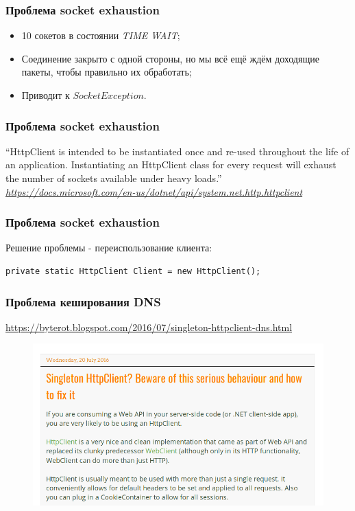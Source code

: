 \documentclass{beamer}
\begin{document}
\begin{frame}
\frametitle{Проблема socket exhaustion}
\begin{itemize}
	\item 10 сокетов в состоянии \textit{TIME WAIT};
	\item Соединение закрыто с одной стороны, но мы всё ещё ждём доходящие пакеты, чтобы правильно их обработать;
	\item Приводит к $SocketException$.
\end{itemize}
\end{frame}

\begin{frame}
\frametitle{Проблема socket exhaustion}
``HttpClient is intended to be instantiated once and re-used throughout the life of an application. Instantiating an HttpClient class for every request will exhaust the number of sockets available under heavy loads.''
\newline
\newline
\textit{\href{https://docs.microsoft.com/en-us/dotnet/api/system.net.http.httpclient}{https://docs.microsoft.com/en-us/dotnet/api/system.net.http.httpclient}}
\end{frame}

\begin{frame}[fragile]
\frametitle{Проблема socket exhaustion}
Решение проблемы - переиспользование клиента:
\begin{lstlisting}
private static HttpClient Client = new HttpClient();
\end{lstlisting}
\end{frame}

\begin{frame}
\frametitle{Проблема кеширования DNS}
\href{https://byterot.blogspot.com/2016/07/singleton-httpclient-dns.html}{https://byterot.blogspot.com/2016/07/singleton-httpclient-dns.html}
\begin{figure}
\includegraphics[scale=0.4]{byterot}
\end{figure}
\end{frame}
\end{document}
